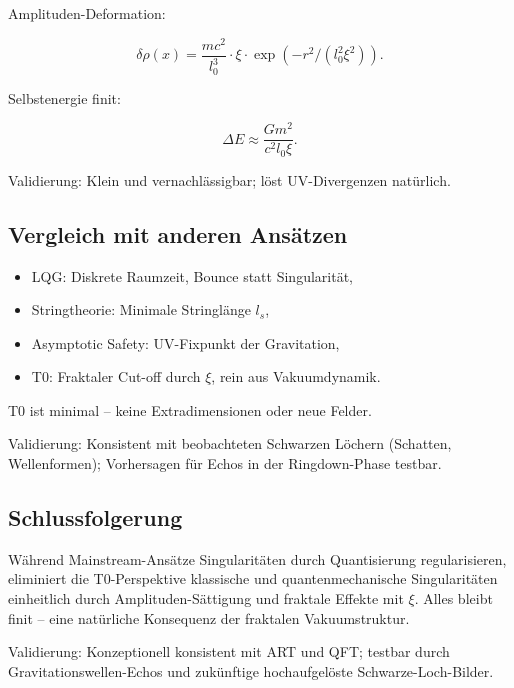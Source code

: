 	Amplituden-Deformation:
	
	\begin{equation}
		\delta \rho(x) = \frac{m c^2}{l_0^3} \cdot \xi \cdot \exp\left(-r^2 / (l_0^2 \xi^2)\right).
	\end{equation}
	
	Selbstenergie finit:
	
	\begin{equation}
		\Delta E \approx \frac{G m^2}{c^2 l_0 \xi}.
	\end{equation}
	
	Validierung: Klein und vernachlässigbar; löst UV-Divergenzen natürlich.
	
	\subsection*{Vergleich mit anderen Ansätzen}
	
	\begin{itemize}
		\item LQG: Diskrete Raumzeit, Bounce statt Singularität,
		\item Stringtheorie: Minimale Stringlänge \(l_s\),
		\item Asymptotic Safety: UV-Fixpunkt der Gravitation,
		\item T0: Fraktaler Cut-off durch \(\xi\), rein aus Vakuumdynamik.
	\end{itemize}
	
	T0 ist minimal – keine Extradimensionen oder neue Felder.
	
	Validierung: Konsistent mit beobachteten Schwarzen Löchern (Schatten, Wellenformen); Vorhersagen für Echos in der Ringdown-Phase testbar.
	
	\subsection*{Schlussfolgerung}
	
	Während Mainstream-Ansätze Singularitäten durch Quantisierung regularisieren, eliminiert die T0-Perspektive klassische und quantenmechanische Singularitäten einheitlich durch Amplituden-Sättigung und fraktale Effekte mit \(\xi\). Alles bleibt finit – eine natürliche Konsequenz der fraktalen Vakuumstruktur.
	
	Validierung: Konzeptionell konsistent mit ART und QFT; testbar durch Gravitationswellen-Echos und zukünftige hochaufgelöste Schwarze-Loch-Bilder.





